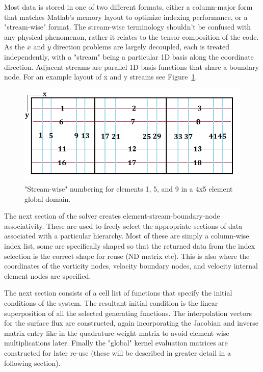 \documentclass[letterpaper,12pt]{report}
\begin{document}
Most data is stored in one of two different formats, either a column-major form that matches Matlab's memory layout to optimize indexing performance, or a "stream-wise" format. The stream-wise terminology shouldn't be confused with any physical phenomenon, rather it relates to the tensor composition of the code. As the $x$ and $y$ direction problems are largely decoupled, each is treated independently, with a "stream" being a particular 1D basis along the coordinate direction. Adjacent streams are parallel 1D basis functions that share a boundary node. For an example layout of x and y streams see Figure~\ref{fig:streams}.
\begin{figure}
\centering
\includegraphics[width=5.5in]{streams.PNG}
\caption{\label{fig:streams}"Stream-wise" numbering for elements 1, 5, and 9 in a 4x5 element global domain.}
\end{figure}
The next section of the solver creates element-stream-boundary-node associativity. These are used to freely select the appropriate sections of data associated with a particular hierarchy. Most of these are simply a column-wise index list, some are specifically shaped so that the returned data from the index selection is the correct shape for reuse (ND matrix etc). This is also where the coordinates of the vorticity nodes, velocity boundary nodes, and velocity internal element nodes are specified. 

The next section consists of a cell list of functions that specify the initial conditions of the system. The resultant initial condition is the linear superposition of all the selected generating functions. The interpolation vectors for the surface flux are constructed, again incorporating the Jacobian and inverse matrix entry like in the quadrature weight matrix to avoid element-wise multiplications later. Finally the "global" kernel evaluation matrices are constructed for later re-use (these will be described in greater detail in a following section).
\end{document}

